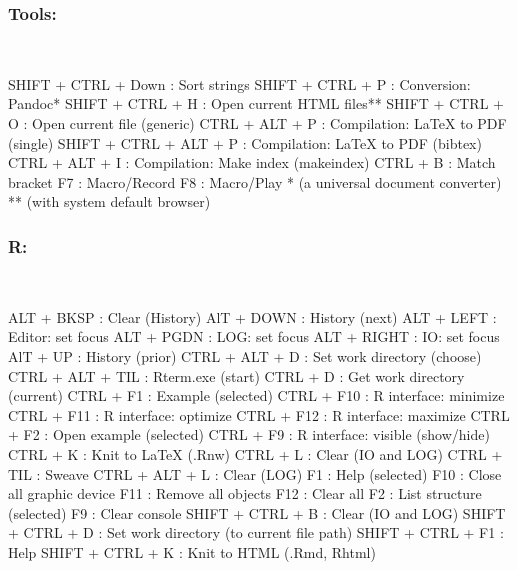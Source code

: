 \subsubsection{Tools:}\\

\vspace{-0.5cm}
\begin{Rtables}[caption={[Tools menu keyboard shortcuts]
    ToolsMenu keyboard shortcuts},
  label=menu:tools]
  SHIFT + CTRL + Down    : Sort strings
  SHIFT + CTRL + P       : Conversion: Pandoc*
  SHIFT + CTRL + H       : Open current HTML files**
  SHIFT + CTRL + O       : Open current file (generic)
  CTRL  + ALT  + P       : Compilation: LaTeX to PDF (single)
  SHIFT + CTRL + ALT + P : Compilation: LaTeX to PDF (bibtex)
  CTRL  + ALT  + I       : Compilation: Make index (makeindex)
  CTRL  + B              : Match bracket
  F7                     : Macro/Record
  F8                     : Macro/Play
  *  (a universal document converter)
  ** (with system default browser)
\end{Rtables}


\newpage
\subsubsection{R:}\\

\vspace{-0.5cm}
\begin{Rtables}[caption={[R menu keyboard shortcuts]
    R menu keyboard shortcuts},
  label=menu:r]
  ALT  + BKSP       : Clear (History)
  AlT  + DOWN       : History (next)
  ALT  + LEFT       : Editor: set focus
  ALT  + PGDN       : LOG: set focus
  ALT  + RIGHT      : IO: set focus
  AlT  + UP         : History (prior)
  CTRL + ALT  + D   : Set work directory (choose)
  CTRL + ALT + TIL  : Rterm.exe (start)
  CTRL + D          : Get work directory (current)
  CTRL + F1         : Example (selected)
  CTRL + F10        : R interface: minimize
  CTRL + F11        : R interface: optimize
  CTRL + F12        : R interface: maximize
  CTRL + F2         : Open example (selected)
  CTRL + F9         : R interface: visible (show/hide)
  CTRL + K          : Knit to LaTeX (.Rnw)
  CTRL + L          : Clear (IO and LOG)
  CTRL + TIL        : Sweave
  CTRL + ALT + L    : Clear (LOG)
  F1                : Help (selected)
  F10               : Close all graphic device
  F11               : Remove all objects
  F12               : Clear all
  F2                : List structure (selected)
  F9                : Clear console
  SHIFT + CTRL + B  : Clear (IO and LOG)
  SHIFT + CTRL + D  : Set work directory (to current file path)
  SHIFT + CTRL + F1 : Help
  SHIFT + CTRL + K  : Knit to HTML (.Rmd, Rhtml)
\end{Rtables}



